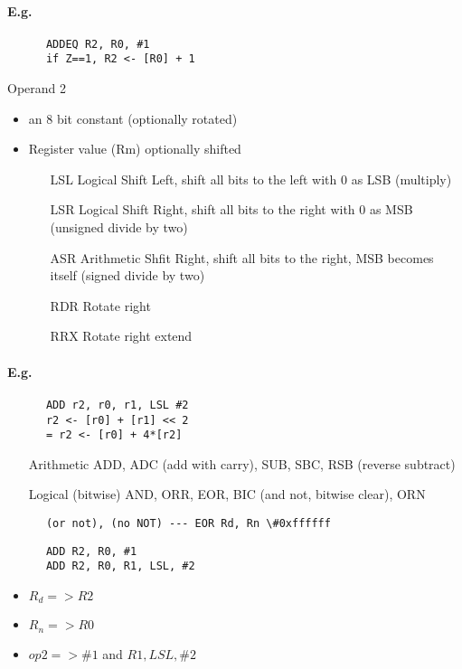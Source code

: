 \documentclass[12pt]{report}
\begin{document}
    \paragraph{E.g.}
    \begin{lstlisting}
      ADDEQ R2, R0, #1
      if Z==1, R2 <- [R0] + 1
    \end{lstlisting}

    Operand 2
    \begin{itemize}
      \item an 8 bit constant (optionally rotated)
      \item Register value (Rm) optionally shifted
      \begin{itemize}
        \item[LSL] Logical Shift Left, shift all bits to the left with 0 as LSB
          (multiply)
        \item[LSR] Logical Shift Right, shift all bits to the right with 0 as
          MSB (unsigned divide by two)
        \item[ASR] Arithmetic Shfit Right, shift all bits to the right, MSB
          becomes itself (signed divide by two)
        \item[RDR] Rotate right
        \item[RRX] Rotate right extend
      \end{itemize}
    \end{itemize}
    \paragraph{E.g.}
    \begin{lstlisting}
      ADD r2, r0, r1, LSL #2
      r2 <- [r0] + [r1] << 2
      = r2 <- [r0] + 4*[r2]
    \end{lstlisting}

    \begin{itemize}
      \item[Arithmetic] ADD, ADC (add with carry), SUB, SBC, RSB (reverse
      subtract)
      \item[Logical] (bitwise) AND, ORR, EOR, BIC (and not, bitwise clear), ORN
    \end{itemize}
    \begin{lstlisting}
      (or not), (no NOT) --- EOR Rd, Rn \#0xffffff
    \end{lstlisting}


    \begin{lstlisting}
      ADD R2, R0, #1
      ADD R2, R0, R1, LSL, #2
    \end{lstlisting}
    \begin{itemize}
      \item $R_d => R2$
      \item $R_n => R0$
      \item $op2 => \#1$ and $R1, LSL, \#2$
    \end{itemize}
\end{document}
